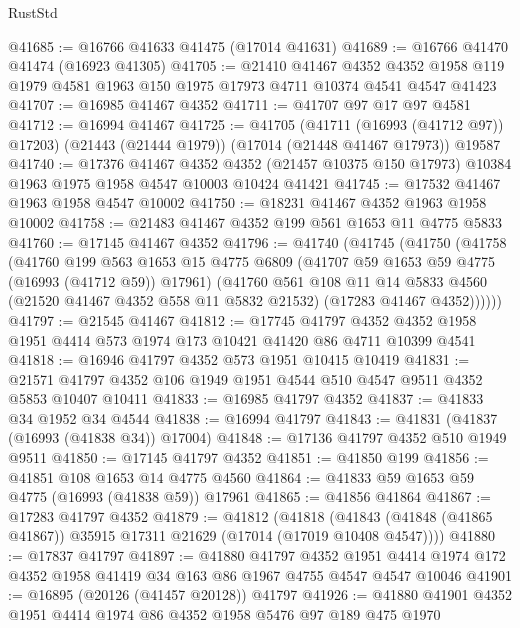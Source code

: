 \begin{lexlean}{RustStd}
\begin{coremodule}
{\begin{coremodule}
{{{{{{{{{{{{{{{{{{{{{{{{{{{{{{{{{{{{{{{{{{{{{{{{{{{{{{{@41685 := @16766 @41633 @41475 (@17014 @41631)
@41689 := @16766 @41470 @41474 (@16923 @41305)
@41705 := @21410
    @41467
    @4352
    @4352
    @1958
    @119
    @1979
    @4581
    @1963
    @150
    @1975
    @17973
    @4711
    @10374
    @4541
    @4547
    @41423
@41707 := @16985 @41467 @4352
@41711 := @41707 @97 @17 @97 @4581
@41712 := @16994 @41467
@41725 := @41705
    (@41711 (@16993 (@41712 @97)) @17203)
    (@21443 (@21444 @1979))
    (@17014 (@21448 @41467 @17973))
    @19587
@41740 := @17376
    @41467
    @4352
    @4352
    (@21457 @10375 @150 @17973)
    @10384
    @1963
    @1975
    @1958
    @4547
    @10003
    @10424
    @41421
@41745 := @17532 @41467 @1963 @1958 @4547 @10002
@41750 := @18231 @41467 @4352 @1963 @1958 @10002
@41758 := @21483 @41467 @4352 @199 @561 @1653 @11 @4775 @5833
@41760 := @17145 @41467 @4352
@41796 := @41740
    (@41745
      (@41750
        (@41758
          (@41760
            @199
            @563
            @1653
            @15
            @4775
            @6809
            (@41707 @59 @1653 @59 @4775 (@16993 (@41712 @59)) @17961)
            (@41760
              @561
              @108
              @11
              @14
              @5833
              @4560
              (@21520 @41467 @4352 @558 @11 @5832 @21532)
              (@17283 @41467 @4352))))))
@41797 := @21545 @41467
@41812 := @17745
    @41797
    @4352
    @4352
    @1958
    @1951
    @4414
    @573
    @1974
    @173
    @10421
    @41420
    @86
    @4711
    @10399
    @4541
@41818 := @16946 @41797 @4352 @573 @1951 @10415 @10419
@41831 := @21571 @41797 @4352 @106 @1949 @1951 @4544 @510 @4547 @9511 @4352 @5853 @10407 @10411
@41833 := @16985 @41797 @4352
@41837 := @41833 @34 @1952 @34 @4544
@41838 := @16994 @41797
@41843 := @41831 (@41837 (@16993 (@41838 @34)) @17004)
@41848 := @17136 @41797 @4352 @510 @1949 @9511
@41850 := @17145 @41797 @4352
@41851 := @41850 @199
@41856 := @41851 @108 @1653 @14 @4775 @4560
@41864 := @41833 @59 @1653 @59 @4775 (@16993 (@41838 @59)) @17961
@41865 := @41856 @41864
@41867 := @17283 @41797 @4352
@41879 := @41812
    (@41818 (@41843 (@41848 (@41865 @41867)) @35915 @17311 @21629 (@17014 (@17019 @10408 @4547))))
@41880 := @17837 @41797
@41897 := @41880
    @41797
    @4352
    @1951
    @4414
    @1974
    @172
    @4352
    @1958
    @41419
    @34
    @163
    @86
    @1967
    @4755
    @4547
    @4547
    @10046
@41901 := @16895 (@20126 (@41457 @20128)) @41797
@41926 := @41880
    @41901
    @4352
    @1951
    @4414
    @1974
    @86
    @4352
    @1958
    @5476
    @97
    @189
    @475
    @1970
}}}}}}}}}}}}}}}}}}}}}}}}}}}}}}}}}}}}}}}}}}}}}}}}}}}}}}}
\end{coremodule}}
\end{coremodule}
\end{lexlean}
